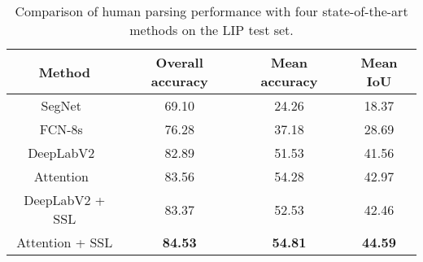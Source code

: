\documentclass[10pt,twocolumn,letterpaper]{article}
\begin{document}
\begin{table}[]
\centering
\scriptsize
\begin{tabular}{cccc}
\toprule[0.7pt]
   Method                                       & Overall accuracy & Mean accuracy   & Mean IoU  \\ \hline 
   SegNet~\cite{badrinarayanan2015segnet}       & 69.10            & 24.26           & 18.37    \\
   FCN-8s~\cite{long2014fully}                  & 76.28            & 37.18           & 28.69    \\
   DeepLabV2~\cite{chen2014semantic}     & 82.89            & 51.53           & 41.56     \\
   Attention~\cite{chen2015attention}  & 83.56            & 54.28           & 42.97     \\ \hline
   DeepLabV2 + SSL                       & 83.37            & 52.53           & 42.46     \\
   Attention + SSL                     & \textbf{84.53}   & \textbf{54.81}  & \textbf{44.59}    \\
\toprule[0.7pt]
\end{tabular}
\vspace{-4mm}
\caption{Comparison of human parsing performance with four state-of-the-art methods on the LIP test set.}
\vspace{-6mm}
\label{tab: lip_test}
\end{table}
\end{document}

